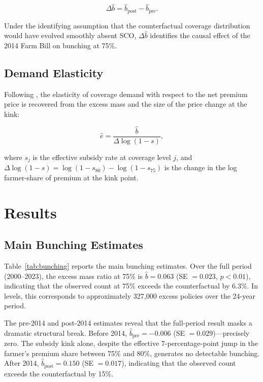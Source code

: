 \documentclass[12pt]{article}
\begin{document}
\begin{equation}
\Delta\hat{b} = \hat{b}_{\text{post}} - \hat{b}_{\text{pre}}.
\end{equation}

Under the identifying assumption that the counterfactual coverage distribution would have evolved smoothly absent SCO, $\Delta\hat{b}$ identifies the causal effect of the 2014 Farm Bill on bunching at 75\%.

\subsection{Demand Elasticity}

Following \citet{saez2010}, the elasticity of coverage demand with respect to the net premium price is recovered from the excess mass and the size of the price change at the kink:

\begin{equation}
\hat{e} = \frac{\hat{b}}{\Delta \log(1 - s)},
\end{equation}

\noindent where $s_j$ is the effective subsidy rate at coverage level $j$, and $\Delta \log(1-s) = \log(1 - s_{80}) - \log(1 - s_{75})$ is the change in the log farmer-share of premium at the kink point.


\section{Results}

\subsection{Main Bunching Estimates}

Table~\ref{tab:bunching} reports the main bunching estimates. Over the full period (2000--2023), the excess mass ratio at 75\% is $\hat{b} = 0.063$ (SE $= 0.023$, $p < 0.01$), indicating that the observed count at 75\% exceeds the counterfactual by 6.3\%. In levels, this corresponds to approximately 327,000 excess policies over the 24-year period.

The pre-2014 and post-2014 estimates reveal that the full-period result masks a dramatic structural break. Before 2014, $\hat{b}_{\text{pre}} = -0.006$ (SE $= 0.029$)---precisely zero. The subsidy kink alone, despite the effective 7-percentage-point jump in the farmer's premium share between 75\% and 80\%, generates no detectable bunching. After 2014, $\hat{b}_{\text{post}} = 0.150$ (SE $= 0.017$), indicating that the observed count exceeds the counterfactual by 15\%.
\end{document}
